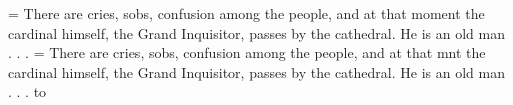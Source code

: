 \def\tstoryA{There are cries, sobs, confusion among the people, and at
that moment the cardinal himself, the Grand Inquisitor, passes by the
cathedral. He is an old man . . .}
\def\tstoryB{There are cries, sobs, confusion among the people, and at
that m\discretionary{om-}{e}{ome}nt the cardinal himself, the Grand
Inquisitor, passes by the cathedral. He is an old man . . .}
=\vbox{\hsize=2.25in \tstoryA}
=\vbox{\hsize=2.25in \tstoryB}
\hbox to 
\bye
